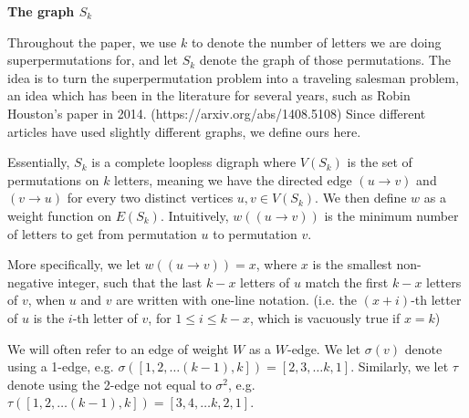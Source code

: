 \documentclass{article}
\newcommand{\hide}[1]{}
\begin{document}
\vspace{1.75em}

\textbf{The graph $S_k$} 

Throughout the paper, we use $k$ to denote the number of letters we are doing superpermutations for, and let $S_k$ denote the graph of those permutations. The idea is to turn the superpermutation problem into a traveling salesman problem, an idea which has been in the literature for several years, such as Robin Houston's paper in 2014. (https://arxiv.org/abs/1408.5108) \hide{@misc{houston2014tackling,
    title={Tackling the Minimal Superpermutation Problem},
    author={Robin Houston},
    year={2014},
    eprint={1408.5108},
    archivePrefix={arXiv},
    primaryClass={math.CO}
}} Since different articles have used slightly different graphs, we define ours here.

Essentially, $S_k$ is a complete loopless digraph where $V(S_k)$ is the set of permutations on $k$ letters, meaning we have the directed edge $(u \to v)$ and $(v \to u)$ for every two distinct vertices $u,v \in V(S_k)$. We then define $w$ as a weight function on $E(S_k)$. Intuitively, $w((u\to v))$ is the minimum number of letters to get from permutation $u$ to permutation $v$. 
 
 More specifically, we let $w((u\to v)) = x$, where $x$ is the smallest non-negative integer, such that the last $k-x$ letters of $u$ match the first $k-x$ letters of $v$, when $u$ and $v$ are written with one-line notation. (i.e. the $(x+i)$-th letter of $u$ is the $i$-th letter of $v$, for $1\le i \le k-x $, which is vacuously true if $x = k$)
 
 \hide{Specifically, we will define $S_k$ through the $k$-dimensional De Bruijn graph on $k$ letters, $G_k$. We define $A_k = \{1,2\dots k\}$ which is intuitively our alphabet. We have that $V(G_k) = A_k^k$, and that for each vertex, $v = [a_1, a_2\dots a_k]$, we have the directed edges $(v \to [a_2, a_3 \dots a_k,b])$, for each $b \in A_k$. We then create a weight $w'$, where $w'(u \to v)$ is the length of the shortest directed path from $u$ to $v$ in $G_k$. We then have that $S_k$ is a directed weighted graph where $V(S_k)$ is the set of permutations of $A_k$, with $w(u \to v) = w'(u \to v)$ for each $u,v \in V(S_k)$.}

We will often refer to an edge of weight $W$ as a $W$-edge. We let $\sigma(v)$ denote using a 1-edge, e.g. $\sigma([1,2,\dots (k-1), k]) = [2,3,\dots k,1]$. Similarly, we let $\tau$ denote using the 2-edge not equal to $\sigma^2$, e.g. $\tau([1,2,\dots (k-1), k]) = [3,4,\dots k,2,1]$.
\end{document}
